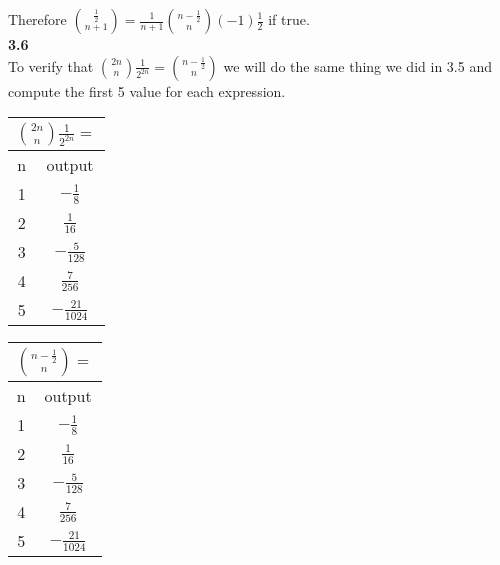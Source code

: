 \documentclass[10pt,a4paper]{report}
\begin{document}
	
	Therefore $\binom{\frac{1}{2}}{n+1} = \frac{1}{n+1}\binom{n-\frac{1}{2}}{n}(-1)\frac{1}{2}$ if true.\\
	\newline
	\textbf{3.6}\\
	To verify that $\binom{2n}{n}\frac{1}{2^{2n}} = \binom{n-\frac{1}{2}}{n}$ we will do the same thing we did in 3.5 and compute the first 5 value for each expression.\\
	\begin{center}
		\begin{tabular}{|c|c|}
			\hline
			\multicolumn{2}{|c|}{$\binom{2n}{n}\frac{1}{2^{2n}} = $} \\[.25cm]
			\hline
			n&output\\
			\hline
			1&$-\frac{1}{8}$\\[.25cm]
			\hline
			2&$\frac{1}{16}$\\[.25cm]
			\hline
			3&$-\frac{5}{128}$\\[.25cm]
			\hline
			4&$\frac{7}{256}$\\[.25cm]
			\hline
			5&$-\frac{21}{1024}$\\[.25cm]
			\hline
		\end{tabular}
		\hspace{2em}
		\begin{tabular}{|c|c|}
			\hline
			\multicolumn{2}{|c|}{$\binom{n-\frac{1}{2}}{n} = $} \\[.25cm]
			\hline
			n&output\\
			\hline
			1&$-\frac{1}{8}$\\[.25cm]
			\hline
			2&$\frac{1}{16}$\\[.25cm]
			\hline
			3&$-\frac{5}{128}$\\[.25cm]
			\hline
			4&$\frac{7}{256}$\\[.25cm]
			\hline
			5&$-\frac{21}{1024}$\\[.25cm]
			\hline
		\end{tabular}
	\end{center}
	
\end{document}
